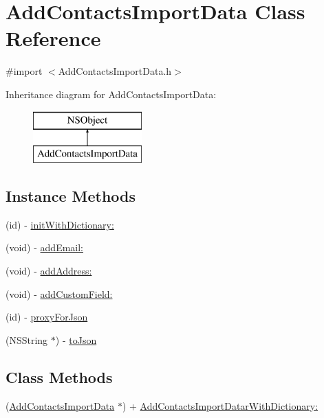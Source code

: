 \hypertarget{interface_add_contacts_import_data}{\section{Add\-Contacts\-Import\-Data Class Reference}
\label{interface_add_contacts_import_data}
}


{\ttfamily \#import $<$Add\-Contacts\-Import\-Data.\-h$>$}

Inheritance diagram for Add\-Contacts\-Import\-Data\-:\begin{figure}[H]
\begin{center}
\leavevmode
\includegraphics[height=2.000000cm]{interface_add_contacts_import_data}
\end{center}
\end{figure}
\subsection*{Instance Methods}
\begin{DoxyCompactItemize}
\item 
(id) -\/ \hyperlink{interface_add_contacts_import_data_a857af9534fbb90f0753ed91a4e98c4ff}{init\-With\-Dictionary\-:}
\item 
(void) -\/ \hyperlink{interface_add_contacts_import_data_a0a8725b2420ef3d4fe64e2f31472c881}{add\-Email\-:}
\item 
(void) -\/ \hyperlink{interface_add_contacts_import_data_a1a6b25e39fec899928e6e38a7046138e}{add\-Address\-:}
\item 
(void) -\/ \hyperlink{interface_add_contacts_import_data_a1c2ad5596b42cc0db4808298eeeb8c55}{add\-Custom\-Field\-:}
\item 
(id) -\/ \hyperlink{interface_add_contacts_import_data_a60ab1ae96322dd76ccb7c9bcbe20093f}{proxy\-For\-Json}
\item 
(N\-S\-String $\ast$) -\/ \hyperlink{interface_add_contacts_import_data_a10a4294a578b5fe115403cfd36a64a96}{to\-Json}
\end{DoxyCompactItemize}
\subsection*{Class Methods}
\begin{DoxyCompactItemize}
\item 
(\hyperlink{interface_add_contacts_import_data}{Add\-Contacts\-Import\-Data} $\ast$) + \hyperlink{interface_add_contacts_import_data_a967337003febb9772f96a9b173c20b25}{Add\-Contacts\-Import\-Datar\-With\-Dictionary\-:}
\end{DoxyCompactItemize}

